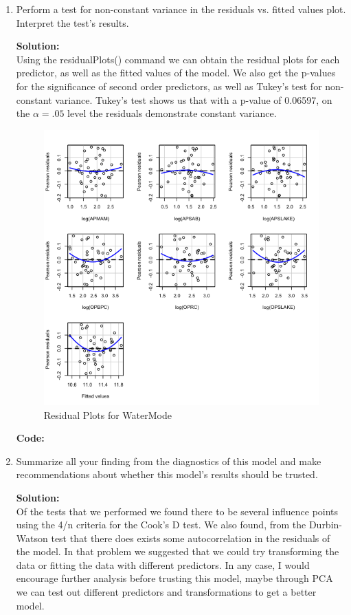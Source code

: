 \documentclass[12pt]{article}
\makeatletter
\theoremstyle{homework}
\newenvironment{exercise}[1]
{\def\@currentlabel{#1}\exercisecore}
{\endexercisecore}
\newcommand{\localhead}[1]{\par\smallskip\noindent\textbf{#1}\nobreak\\}%
\newcommand\solution{\localhead{Solution:}}
\makeatother
\begin{document}
\begin{exercise}{3}
\begin{enumerate}
    \item Perform a test for non-constant variance in the residuals vs. fitted values plot. Interpret the test's results. \\
    \solution Using the residualPlots() command we can obtain the residual plots for each predictor, as well as the fitted values of 
    the model. We also get the p-values for the significance of second order predictors, as well as Tukey's test for non-constant variance. 
    Tukey's test shows us that with a p-value of 0.06597, on the $\alpha = .05$ level the residuals demonstrate constant variance.
    \begin{figure}[H]
      \begin{center}
      \caption{Residual Plots for WaterMode}
      \includegraphics[width = .80\textwidth]{Rplot05.png}
    \end{center}
  \end{figure}
  \textbf{Code:}
  \begin{center}
  
  \end{center} 
  \newpage



    \item Summarize all your finding from the diagnostics of this model and make recommendations about whether this model's results should be 
    trusted. \\
    \solution Of the tests that we performed we found there to be several influence points using the 4/n criteria for the Cook's D test. 
    We also found, from the Durbin-Watson test that there does exists some autocorrelation in the residuals of the model. In that problem we 
    suggested that we could try transforming the data or fitting the data with different predictors. In any case, I would encourage further analysis 
    before trusting this model, maybe through PCA we can test out different predictors and transformations to get a better model. 
  \end{enumerate}
  
\end{exercise}
\end{document}

